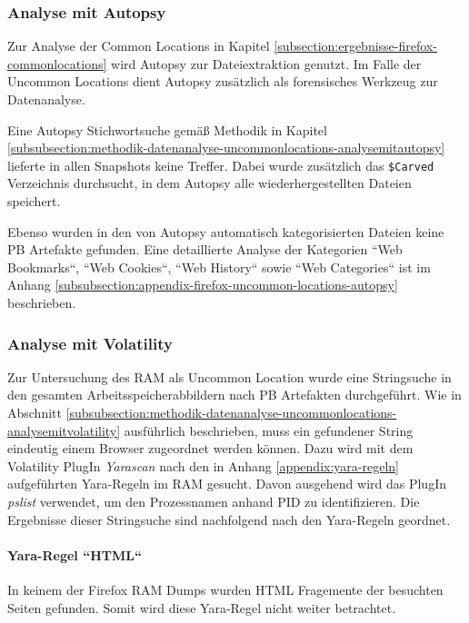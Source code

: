 \subsubsection*{Analyse mit Autopsy}
\label{subsubsection:ergebnisse-firefox-uncommonlocations-analysemitautopsy}
Zur Analyse der Common Locations in Kapitel \ref{subsection:ergebnisse-firefox-commonlocations} wird Autopsy zur Dateiextraktion genutzt. Im Falle der Uncommon Locations dient Autopsy zusätzlich als forensisches Werkzeug zur Datenanalyse.

Eine Autopsy Stichwortsuche gemäß Methodik in Kapitel \ref{subsubsection:methodik-datenanalyse-uncommonlocations-analysemitautopsy} lieferte in allen Snapshots keine Treffer. Dabei wurde zusätzlich das \texttt{\$Carved} Verzeichnis durchsucht, in dem Autopsy alle wiederhergestellten Dateien speichert.

Ebenso wurden in den von Autopsy automatisch kategorisierten Dateien keine PB Artefakte gefunden. Eine detaillierte Analyse der Kategorien ``Web Bookmarks``, ``Web Cookies``, ``Web History`` sowie ``Web Categories`` ist im Anhang \ref{subsubsection:appendix-firefox-uncommon-locations-autopsy} beschrieben.

\subsubsection*{Analyse mit Volatility}
\label{subsubsection:ergebnisse-firefox-uncommonlocations-analysemitvolatility}
Zur Untersuchung des RAM als Uncommon Location wurde eine Stringsuche in den gesamten Arbeitsspeicherabbildern nach PB Artefakten durchgeführt.
Wie in Abschnitt \ref{subsubsection:methodik-datenanalyse-uncommonlocations-analysemitvolatility} ausführlich beschrieben, muss ein gefundener String eindeutig einem Browser zugeordnet werden können. 
Dazu wird mit dem Volatility PlugIn \textit{Yarascan} nach den in Anhang \ref{appendix:yara-regeln} aufgeführten Yara-Regeln im RAM gesucht. Davon ausgehend wird das PlugIn \textit{pslist} verwendet, um den Prozessnamen anhand PID zu identifizieren.
Die Ergebnisse dieser Stringsuche sind nachfolgend nach den Yara-Regeln geordnet.

\paragraph*{Yara-Regel ``HTML``}
In keinem der Firefox RAM Dumps wurden HTML Fragemente der besuchten Seiten gefunden. Somit wird diese Yara-Regel nicht weiter betrachtet.

